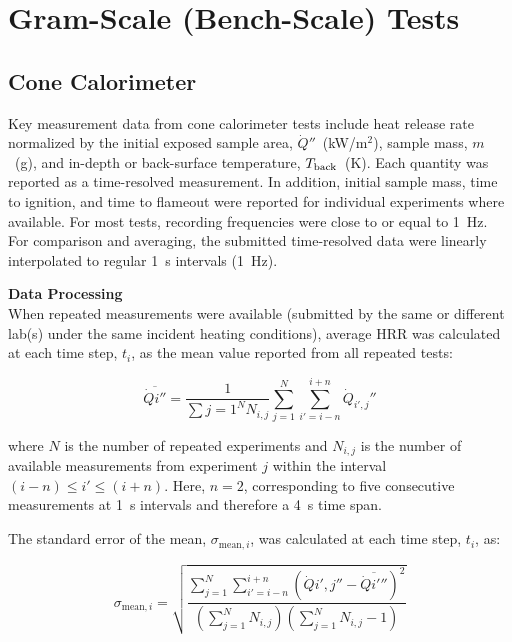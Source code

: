 \documentclass{book}
\begin{document}
\newpage
\section{Gram-Scale (Bench-Scale) Tests}

\subsection{Cone Calorimeter}

Key measurement data from cone calorimeter tests include heat release rate normalized by the initial exposed sample area, $\dot{Q}''$~(kW/m$^2$), sample mass, $m$~(g), and in-depth or back-surface temperature, $T_{\rm back}$~(K). Each quantity was reported as a time-resolved measurement. In addition, initial sample mass, time to ignition, and time to flameout were reported for individual experiments where available. For most tests, recording frequencies were close to or equal to 1~Hz. For comparison and averaging, the submitted time-resolved data were linearly interpolated to regular 1~s intervals (1~Hz).


\textbf{Data Processing} \\
When repeated measurements were available (submitted by the same or different lab(s) under the same incident heating conditions), average HRR was calculated at each time step, $t_i$, as the mean value reported from all repeated tests:

\begin{equation}
  \overline{\dot{Q}i''} =
  \frac{1}{\sum{j=1}^{N} N_{i,j}}
  \sum_{j=1}^{N}
  \sum_{i'=i-n}^{i+n}
  \dot{Q}_{i',j}''
\end{equation}

\noindent where $N$ is the number of repeated experiments and $N_{i,j}$ is the number of available measurements from experiment $j$ within the interval $(i-n) \leq i' \leq (i+n)$. Here, $n=2$, corresponding to five consecutive measurements at 1~s intervals and therefore a 4~s time span.

The standard error of the mean, $\sigma_{\mathrm{mean},i}$, was calculated at each time step, $t_i$, as:

\begin{equation}
  \sigma_{\mathrm{mean},i} =
  \sqrt{
  \frac{
  \displaystyle
  \sum_{j=1}^{N}
  \sum_{i'=i-n}^{i+n}
  \left(
  \dot{Q}{i',j}'' -
  \overline{\dot{Q}{i'}''}
  \right)^2
  }{
  \left(\displaystyle\sum_{j=1}^{N} N_{i,j}\right)
  \left(\displaystyle\sum_{j=1}^{N} N_{i,j}-1\right)
  }}
\end{equation}
\end{document}
